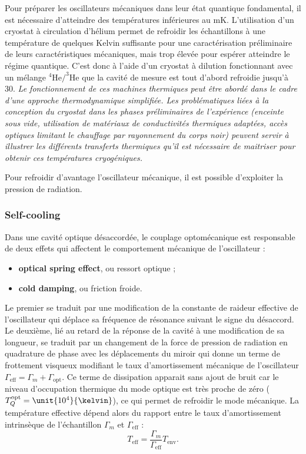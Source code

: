 \documentclass[12pt,a4paper]{article}
\begin{document}
Pour préparer les oscillateurs mécaniques dans leur état quantique fondamental, il est nécessaire d'atteindre des températures inférieures au mK.
L'utilisation d'un cryostat à circulation d'hélium permet de refroidir les échantillons à une température de quelques Kelvin suffisante pour une caractérisation préliminaire de leurs caractéristiques mécaniques, mais trop élevée pour espérer atteindre le régime quantique.
C'est donc à l'aide d'un cryostat à dilution fonctionnant avec un mélange $\mathrm{^4He/^3He}$ que la cavité de mesure est tout d'abord refroidie jusqu'à \unit{30}{\milli\kelvin}.
\textit{Le fonctionnement de ces machines thermiques peut être abordé dans le cadre d'une approche thermodynamique simplifiée.
Les problématiques liées à la conception du cryostat dans les phases préliminaires de l'expérience (enceinte sous vide, utilisation de matériaux de conductivités thermiques adaptées, accès optiques limitant le chauffage par rayonnement du corps noir) peuvent servir à illustrer les différents transferts thermiques qu'il est nécessaire de maitriser pour obtenir ces températures cryogéniques.}

Pour refroidir d'avantage l'oscillateur mécanique, il est possible d'exploiter la pression de radiation.

\subsubsection{Self-cooling}

Dans une cavité optique désaccordée, le couplage optomécanique est responsable de deux effets qui affectent le comportement mécanique de l'oscillateur : 
\begin{itemize}
\item \textbf{optical spring effect}, ou ressort optique ;
\item \textbf{cold damping}, ou friction froide.
\end{itemize}
Le premier se traduit par une modification de la constante de raideur effective de l'oscillateur qui déplace sa fréquence de résonance suivant le signe du désaccord.
Le deuxième, lié au retard de la réponse de la cavité à une modification de sa longueur, se traduit par un changement de la force de pression de radiation en quadrature de phase avec les déplacements du miroir qui donne un terme de frottement visqueux modifiant le taux d'amortissement mécanique de l'oscillateur $\Gamma_\mathrm{eff} = \Gamma_m + \Gamma_\mathrm{opt}$.
Ce terme de dissipation apparait sans ajout de bruit car le niveau d'occupation thermique du mode optique est très proche de zéro ($T_Q^\mathrm{opt}=\unit{10^4}{\kelvin}$), ce qui permet de refroidir le mode mécanique.
La température effective dépend alors du rapport entre le taux d'amortissement intrinsèque de l'échantillon $\Gamma_m$ et $\Gamma_\mathrm{eff}$ :
\begin{equation}
T_\mathrm{eff} = \frac{\Gamma_m}{\Gamma_\mathrm{eff}} T_\mathrm{env}.
\end{equation}
\end{document}
